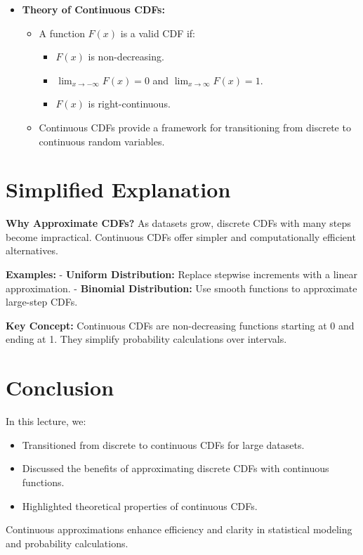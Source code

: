 \documentclass{article}
\begin{document}
\begin{itemize}
  \item \textbf{Theory of Continuous CDFs:}
    \begin{itemize}
      \item A function $F(x)$ is a valid CDF if:
        \begin{itemize}
          \item $F(x)$ is non-decreasing.
          \item $\lim_{x \to -\infty} F(x) = 0$ and $\lim_{x \to \infty} F(x) = 1$.
          \item $F(x)$ is right-continuous.
        \end{itemize}
      \item Continuous CDFs provide a framework for transitioning from discrete to continuous random variables.
    \end{itemize}
\end{itemize}

\section*{Simplified Explanation}

\textbf{Why Approximate CDFs?}
As datasets grow, discrete CDFs with many steps become impractical. Continuous CDFs offer simpler and computationally efficient alternatives.

\textbf{Examples:}
- \textbf{Uniform Distribution:} Replace stepwise increments with a linear approximation.
- \textbf{Binomial Distribution:} Use smooth functions to approximate large-step CDFs.

\textbf{Key Concept:}
Continuous CDFs are non-decreasing functions starting at 0 and ending at 1. They simplify probability calculations over intervals.

\section*{Conclusion}

In this lecture, we:
\begin{itemize}
  \item Transitioned from discrete to continuous CDFs for large datasets.
  \item Discussed the benefits of approximating discrete CDFs with continuous functions.
  \item Highlighted theoretical properties of continuous CDFs.
\end{itemize}

Continuous approximations enhance efficiency and clarity in statistical modeling and probability calculations.
\end{document}
